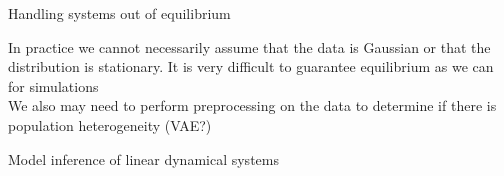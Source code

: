 \documentclass[aspectratio=1610]{beamer}					%
\begin{document}
\begin{frame}{Handling systems out of equilibrium}

In practice we cannot necessarily assume that the data is Gaussian or that the distribution is stationary. It is very difficult to guarantee equilibrium as we can for simulations\\
\vspace{0.2in}
We also may need to perform preprocessing on the data to determine if there is population heterogeneity (VAE?)

\end{frame}

\begin{frame}{Model inference of linear dynamical systems}



\end{frame}
\end{document}
